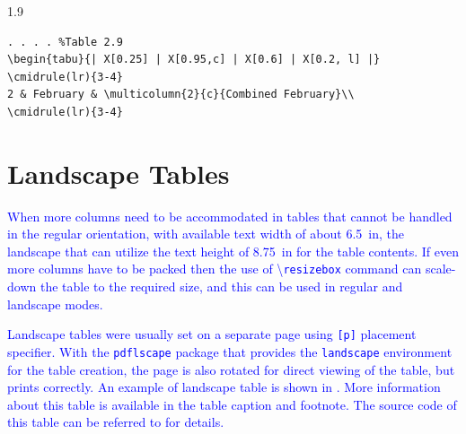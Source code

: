 \documentclass[phd]{ndsu-thesis-2022}
\newcommand\myspacing{1.9}      %
\newcommand\italk[1]{\textcolor{blue}{#1}}  %
\newcommand\cmd[1]{\textbackslash\texttt{#1}}  %
\newcommand\vb[1]{\textcolor{blue}{\texttt{#1}}}%
\begin{document}
\begin{spacing}{\myspacing}
{\begin{verbatim}
. . . . %Table 2.9
\begin{tabu}{| X[0.25] | X[0.95,c] | X[0.6] | X[0.2, l] |}
\cmidrule(lr){3-4}
2 & February & \multicolumn{2}{c}{Combined February}\\
\cmidrule(lr){3-4}
\end{verbatim}
}
 
\section{Landscape Tables}

\italk{When more columns need to be accommodated in tables that cannot be handled in the regular orientation, with available text width of about \SI{6.5}{in}, the landscape that can utilize the text height of \SI{8.75}{in} for the table contents. If even more columns have to be packed then the use of \cmd{resizebox} command can scale-down the table to the required size, and this can be used in regular and landscape modes.}

\italk{Landscape tables were usually set on a separate page using \vb{[p]} placement specifier. With the \vb{pdflscape} package that provides the \vb{landscape} environment for the table creation, the page is also rotated for direct viewing of the table, but prints correctly. An example of landscape table is shown in \Cref{tab210}. More information about this table is available in the table caption and footnote. The source code of this table can be referred to for details.
}


\end{spacing}
\end{document}
